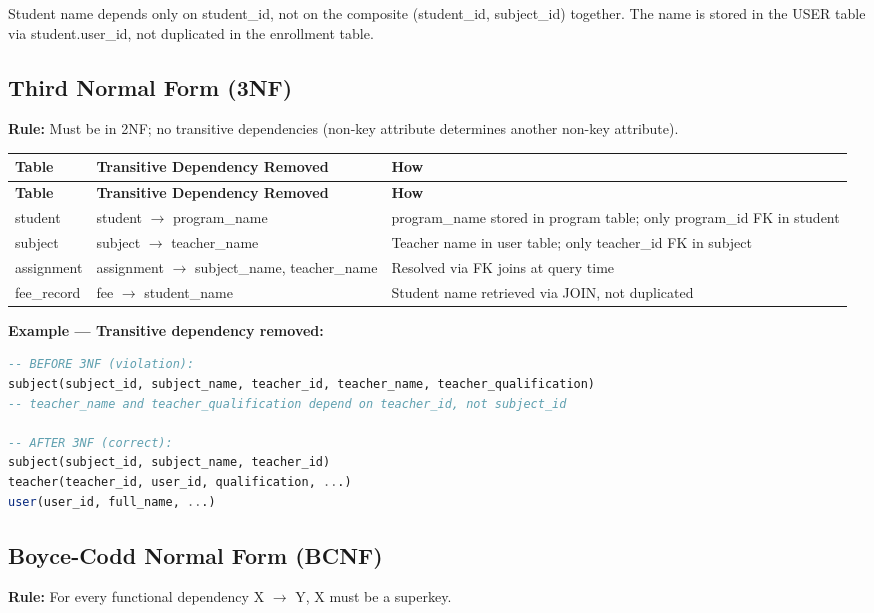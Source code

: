 \documentclass[12pt,a4paper]{report}
\begin{document}
Student name depends only on student\_id, not on the composite (student\_id, subject\_id) together. The name is stored in the USER table via student.user\_id, not duplicated in the enrollment table.

\subsection{Third Normal Form (3NF)}

\textbf{Rule:} Must be in 2NF; no transitive dependencies (non-key attribute determines another non-key attribute).

\begin{longtable}{|L{3cm}|L{5cm}|L{5cm}|}
\hline
\textbf{Table} & \textbf{Transitive Dependency Removed} & \textbf{How} \\
\hline
\endfirsthead
\hline
\textbf{Table} & \textbf{Transitive Dependency Removed} & \textbf{How} \\
\hline
\endhead
student & student $\rightarrow$ program\_name & program\_name stored in program table; only program\_id FK in student \\
\hline
subject & subject $\rightarrow$ teacher\_name & Teacher name in user table; only teacher\_id FK in subject \\
\hline
assignment & assignment $\rightarrow$ subject\_name, teacher\_name & Resolved via FK joins at query time \\
\hline
fee\_record & fee $\rightarrow$ student\_name & Student name retrieved via JOIN, not duplicated \\
\hline
\end{longtable}

\textbf{Example — Transitive dependency removed:}
\begin{lstlisting}[language=SQL]
-- BEFORE 3NF (violation):
subject(subject_id, subject_name, teacher_id, teacher_name, teacher_qualification)
-- teacher_name and teacher_qualification depend on teacher_id, not subject_id

-- AFTER 3NF (correct):
subject(subject_id, subject_name, teacher_id)
teacher(teacher_id, user_id, qualification, ...)
user(user_id, full_name, ...)
\end{lstlisting}

\subsection{Boyce-Codd Normal Form (BCNF)}

\textbf{Rule:} For every functional dependency X $\rightarrow$ Y, X must be a superkey.
\end{document}

